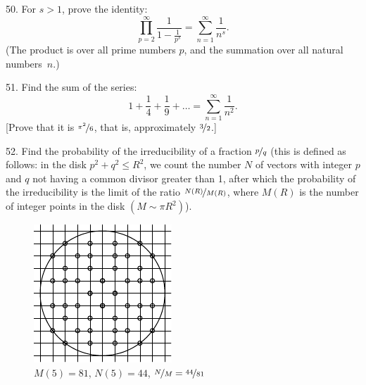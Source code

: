 \begin{problem}{50.}
	For $s>1$, prove the identity:
	\begin{equation*}
		\textstyle\prod\limits_{p=2}^{\infty} \frac{1}{1-\frac{1}{p^s}}=\textstyle\sum\limits_{n=1}^{\infty} \frac{1}{n^s}.
	\end{equation*}
	(The product is over all prime numbers $p$, and the summation over all natural numbers~$n$.)
\end{problem}

\begin{problem}{51.}
	Find the sum of the series:
	\begin{equation*}
		1+ \frac{1}{4}+ \frac{1}{9}+\dots=\textstyle\sum\limits_{n=1}^{\infty} \frac{1}{n^2}.
	\end{equation*}
	[Prove that it is $\nicefrac{\pi^2}{6}$, that is, approximately $\nicefrac{3}{2}$.]
\end{problem}

\begin{problem}{52.}
	Find the probability of the irreducibility of a fraction $\nicefrac{p}{q}$ (this is defined as follows:
	in the disk $p^2+q^2 \leqslant R^2$, we count the number $N$ of vectors with integer
	$p$ and $q$ not having a common divisor greater than 1, after which the probability of the irreducibility is the
	limit of the ratio $\nicefrac{N(R)}{M(R)}$, where $M(R)$ is the number of integer points in the disk $(M \sim \pi R^2)$).
	\begin{figure}
		\includegraphics{resources/taskbook-36}\\
		\footnotesize $M(5)=81$, $N(5)=44$, $\nicefrac{N}{M} = \nicefrac{44}{81}$
	\end{figure}
\end{problem}

